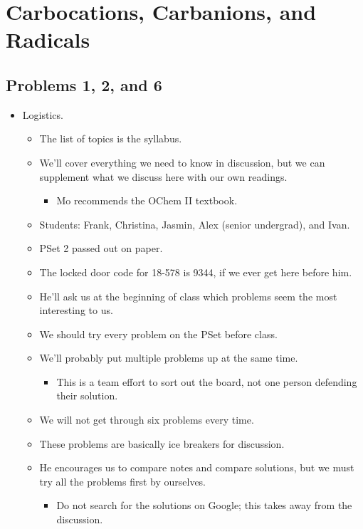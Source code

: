 \documentclass[../notes.tex]{subfiles}
\begin{document}
\chapter{Carbocations, Carbanions, and Radicals}
\section{Problems 1, 2, and 6}
\begin{itemize}
    \item {}Logistics.
    \begin{itemize}
        \item The list of topics is the syllabus.
        \item We'll cover everything we need to know in discussion, but we can supplement what we discuss here with our own readings.
        \begin{itemize}
            \item Mo recommends the OChem II textbook.
        \end{itemize}
        \item Students: Frank, Christina, Jasmin, Alex (senior undergrad), and Ivan.
        \item PSet 2 passed out on paper.
        \item The locked door code for 18-578 is 9344, if we ever get here before him.
        \item He'll ask us at the beginning of class which problems seem the most interesting to us.
        \item We should try every problem on the PSet before class.
        \item We'll probably put multiple problems up at the same time.
        \begin{itemize}
            \item This is a team effort to sort out the board, not one person defending their solution.
        \end{itemize}
        \item We will not get through six problems every time.
        \item These problems are basically ice breakers for discussion.
        \item He encourages us to compare notes and compare solutions, but we must try all the problems first by ourselves.
        \begin{itemize}
            \item Do not search for the solutions on Google; this takes away from the discussion.

\end{itemize}
\end{itemize}
\end{itemize}
\end{document}
